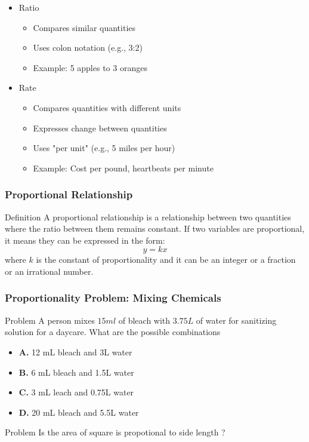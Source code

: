\documentclass{beamer}
\begin{document}
    \begin{frame}
    \begin{itemize}
        \item Ratio
            \begin{itemize}
                \item Compares similar quantities
                \item Uses colon notation (e.g., 3:2)
                \item Example: 5 apples to 3 oranges
            \end{itemize}
        \item Rate
            \begin{itemize}
                \item Compares quantities with different units
                \item Expresses change between quantities
                \item Uses "per unit" (e.g., 5 miles per hour)
                \item Example: Cost per pound, heartbeats per minute
            \end{itemize}
    \end{itemize}
\end{frame}

\begin{frame}
    \frametitle{Proportional Relationship}

    \begin{block}{Definition}
        A proportional relationship is a relationship between two quantities where the ratio between them remains constant. 
        If two variables are proportional, it means they can be expressed in the form:
        $$ y = kx $$
        where $ k $ is the constant of proportionality and it can be an integer or a fraction or an irrational number.
    \end{block}
\end{frame}

\begin{frame}
    \frametitle{Proportionality Problem: Mixing Chemicals}

    \begin{block}{Problem}
        A person mixes $15 ml$ of bleach with $3.75 L$ of water for sanitizing solution for a daycare. What are the possible combinations 
    \end{block}

    \begin{itemize}
        \item \textbf{A.} 12 mL bleach and 3L water
        \item \textbf{B.} 6 mL bleach and 1.5L water
        \item \textbf{C.} 3 mL leach and 0.75L water
        \item \textbf{D.} 20 mL bleach and 5.5L water
    \end{itemize}
    \begin{block}{Problem}
        Is the area of square is propotional to side length ?
    \end{block}
\end{frame}
\end{document}
